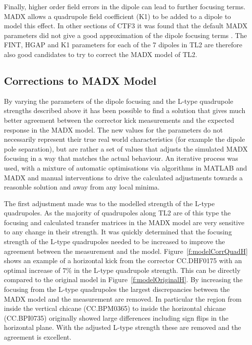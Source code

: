 Finally, higher order field errors in the dipole can lead to further focusing terms. MADX allows a quadrupole field coefficient (K1) to be added to a dipole to model this effect. In other sections of CTF3 it was found that the default MADX parameters did not give a good approximation of the dipole focusing terms \cite{benOptics}. The FINT, HGAP and K1 parameters for each of the 7 dipoles in TL2 are therefore also good candidates to try to correct the  MADX model of TL2.

\subsection{Corrections to MADX Model}
\label{ss:modelCorrections}

By varying the parameters of the dipole focusing and the L-type quadrupole strengths described above it has been possible to find a solution that gives much better agreement between the corrector kick measurements and the expected response in the MADX model. The new values for the parameters do not necessarily represent their true real world characteristics (for example the dipole pole separation), but are rather a set of values that adjusts the simulated MADX focusing in a way that matches the actual behaviour. An iterative process was used, with a mixture of automatic optimisations via algorithms in MATLAB and MADX and manual interventions to drive the calculated adjustments towards a reasonble solution and away from any local minima.

The first adjustment made was to the modelled strength of the L-type quadrupoles. As the majority of quadrupoles along TL2 are of this type the focusing and calculated transfer matrices in the MADX model are very sensitive to any change in their strength. It was quickly determined that the focusing strength of the L-type quadrupoles needed to be increased to improve the agreement between the measurement and the model. Figure~\ref{f:modelCorrQuadH} shows an example of a horizontal kick from the corrector CC.DHF0175 with an optimal increase of \(7\%\) in the L-type quadrupole strength. This can be directly compared to the original model in Figure~\ref{f:modelOriginalH}. By increasing the focusing from the L-type quadrupoles the largest discrepancies between the MADX model and the measurement are removed. In particular the region from inside the vertical chicane (CC.BPM0365) to inside the horizontal chicane (CC.BPI0735) originally showed large differences including sign flips in the horizontal plane. With the adjusted L-type strength these are removed and the agreement is excellent.

